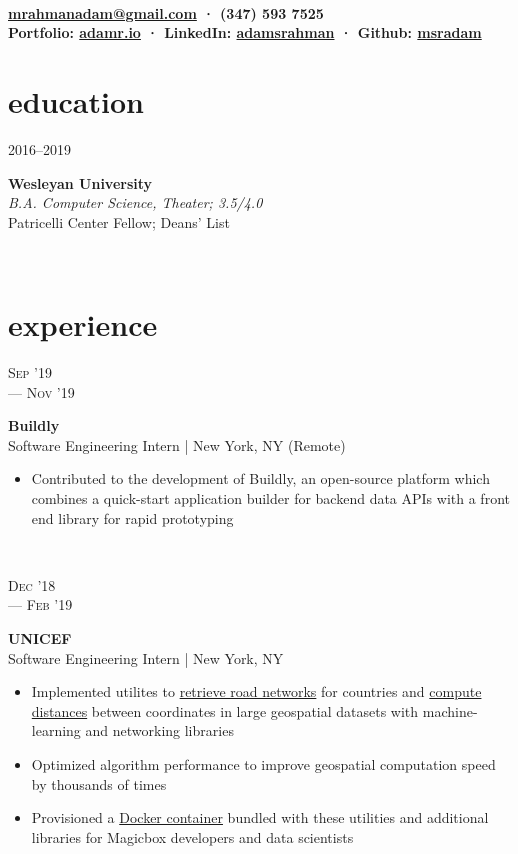 \documentclass[letterpaper, 10.5pt]{article}
\author{Adam Rahman}
\makeatletter
\renewcommand{\maketitle}{
	\hspace{.125\textwidth}
	\begin{minipage}[t]{.75\textwidth}
    \begin{center}
        \fontsize{16pt}{15pt}\selectfont\bfseries \theauthor \\
        \fontsize{10pt}{15pt}\selectfont\sf
        \href{mailto:mrahmanadam@gmail.com}{mrahmanadam@gmail.com} · (347) 593 7525 \\
        Portfolio: \href{http://adamr.io}{adamr.io} · 
        LinkedIn: \href{https://www.linkedin.com/in/adamsrahman/}{adamsrahman} · 
        Github: \href{https://github.com/msradam}{msradam}  \\ 
        \end{center}
    \end{minipage}}
\newcommand{\eduentry}[4]{
    \begin{minipage}[t]{.15\linewidth}
    \hfill \textsc{#1}
    \end{minipage}
    \hfill\vline\hfill
    \begin{minipage}[t]{.80\linewidth}
    {\bf\large#2}
    \vspace{1pt}
    \\\textit{#3} \small{#4}
    \end{minipage}\\
    \vspace{.125cm}
    }
\newcommand{\expentry}[5]{
    \begin{minipage}[t]{.15\linewidth}
    \hfill \textsc{#1} \\
    \hfill \hspace*{5pt}\hfill --- \textsc{#2}
    \end{minipage}
    \hfill\vline\hfill
    \begin{minipage}[t]{.80\linewidth}
    {\bf\large#3}
    \\ #4 
    \vspace{-1.5mm}
    \small{#5}
    \end{minipage}\\
    \vspace{.125cm}
    }
\makeatother
\begin{document}
    \maketitle
    \vspace{.125cm}


    \section{education}
    \eduentry{2016--2019}
    {Wesleyan University}
    {B.A. Computer Science, Theater; 3.5/4.0}
    {\\ Patricelli Center Fellow; Deans' List}

    \section{experience}
    \expentry{Sep '19}
    {Nov '19}
    {Buildly}
    {Software Engineering Intern | New York, NY (Remote)}
    {

        \begin{itemize}{\leftmargin=0.5em \itemindent=0em}
          \setlength\itemsep{0.1mm}
          \item Contributed to the development of Buildly, an open-source platform  which combines a quick-start application builder for backend data APIs with a front end library for rapid prototyping 
        \end{itemize}
        
    }

    \expentry{Dec '18}
    {Feb '19}
    {UNICEF}
    {Software Engineering Intern | New York, NY}
    {

        \begin{itemize}{\leftmargin=0.5em \itemindent=0em}
          \setlength\itemsep{0.1mm}
          \item Implemented utilites to \href{https://github.com/unicef/magicbox-download-roads}{retrieve road networks} for countries and \href{https://github.com/msradam/magicbox-site-routing}{compute distances} between coordinates in large geospatial datasets with machine-learning and networking libraries
          \item Optimized algorithm performance to improve geospatial computation speed by thousands of times 
          \item Provisioned a \href{https://hub.docker.com/r/msradam/magicbox-tools}{Docker container} bundled with these utilities and additional libraries for Magicbox developers and data scientists
        \end{itemize}
        
    }
\end{document}
